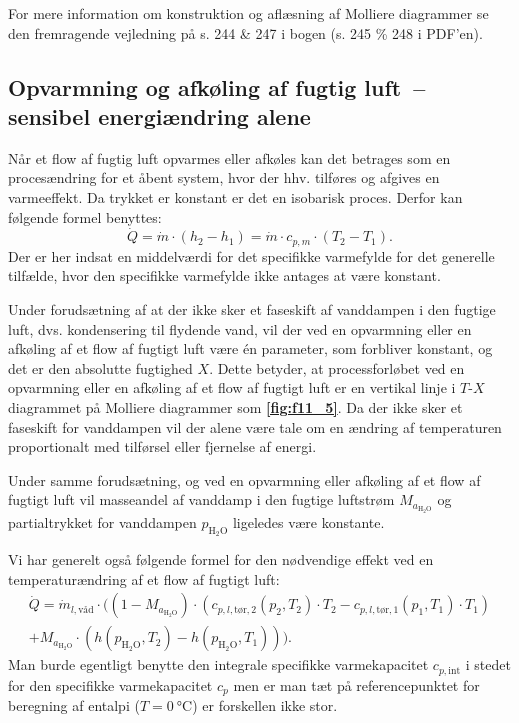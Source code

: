 For mere information om konstruktion og aflæsning af Molliere diagrammer se den fremragende vejledning på s. 244 \& 247 i bogen (s. 245 \% 248 i PDF'en). 

\subsection{Opvarmning og afkøling af fugtig luft – sensibel energiændring alene}
Når et flow af fugtig luft opvarmes eller afkøles kan det betrages som en procesændring for et åbent system, hvor der hhv. tilføres og afgives en varmeeffekt. Da trykket er konstant er det en isobarisk proces. Derfor kan følgende formel benyttes:
\[ 
\dot{Q} = \dot{m} \cdot (h_2 - h_1) = \dot{m} \cdot c_{p,m} \cdot \left( T_2 - T_1 \right)
.\]
Der er her indsat en middelværdi for det specifikke varmefylde for det generelle tilfælde, hvor den specifikke varmefylde ikke antages at være konstant. 

Under forudsætning af at der ikke sker et faseskift af vanddampen i den fugtige luft, dvs. kondensering til flydende vand, vil der ved en opvarmning eller en afkøling af et flow af fugtigt luft være én parameter, som forbliver konstant, og det er den absolutte fugtighed $X$. Dette betyder, at processforløbet ved en opvarmning eller en afkøling af et flow af fugtigt luft er en vertikal linje i $T$-$X$ diagrammet på Molliere diagrammer som \textbf{\autoref{fig:f11_5}}. Da der ikke sker et faseskift for vanddampen vil der alene være tale om en ændring af temperaturen proportionalt med tilførsel eller fjernelse af energi.

Under samme forudsætning, og ved en opvarmning eller afkøling af et flow af fugtigt luft vil masseandel af vanddamp i den fugtige luftstrøm $M_{a_{\mathrm{H}_2 \mathrm{O}}}$ og partialtrykket for vanddampen $p_{\mathrm{H}_2 \mathrm{O}}$ ligeledes være konstante.

Vi har generelt også følgende formel for den nødvendige effekt ved en temperaturændring af et flow af fugtigt luft:
\begin{multline*}
  \dot{Q} = \dot{m}_{l, \text{våd}} \cdot \big( \left( 1 - M_{a_{\mathrm{H}_2 \mathrm{O}}} \right) \cdot \left( c_{p, l, \text{tør}, 2} \left( p_2, T_2 \right) \cdot T_2 - c_{p, l, \text{tør}, 1} \left( p_1, T_1 \right) \cdot T_1 \right) \\
  + M_{a_{\mathrm{H}_2 \mathrm{O}}} \cdot \left( h \left( p_{\mathrm{H}_2 \mathrm{O}}, T_2 \right) - h \left( p_{\mathrm{H}_2 \mathrm{O}}, T_1 \right) \right) \big)
.\end{multline*}
Man burde egentligt benytte den integrale specifikke varmekapacitet $c_{p, \text{int}}$ i stedet for den specifikke varmekapacitet $c_p$ men er man tæt på referencepunktet for beregning af entalpi ($T = \qty{0}{\celsius} $) er forskellen ikke stor. 

